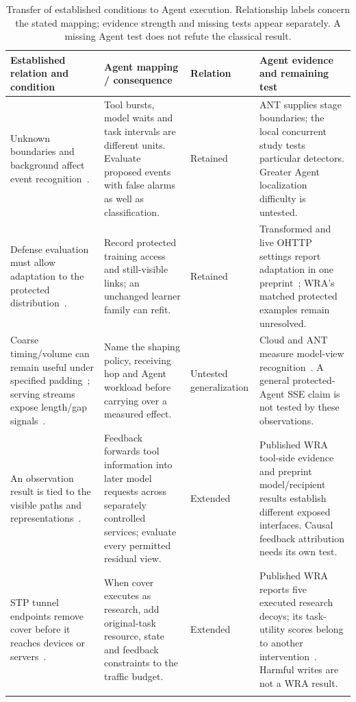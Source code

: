 \begin{table}[t]\centering\small
\caption{Transfer of established conditions to Agent execution. Relationship labels concern the stated mapping; evidence strength and missing tests appear separately. A missing Agent test does not refute the classical result.}\label{tab:transfer-matrix}
\setlength{\tabcolsep}{4pt}
\begin{tabularx}{\textwidth}{@{}P{.25\textwidth}P{.29\textwidth}P{.10\textwidth}Y@{}}\toprule
Established relation and condition & Agent mapping / consequence & Relation & Agent evidence and remaining test \\\midrule
Unknown boundaries and background affect event recognition~\cite{wang2016realistic,guan2021bapm,deng2023ares,trimananda2020pingpong}. & Tool bursts, model waits and task intervals are different units. Evaluate proposed events with false alarms as well as classification. & Retained & ANT supplies stage boundaries; the local concurrent study tests particular detectors. Greater Agent localization difficulty is untested. \\\addlinespace[3pt]
Defense evaluation must allow adaptation to the protected distribution~\cite{dyer2012peekaboo,mathews2023critical,tramer2020adaptive}. & Record protected training access and still-visible links; an unchanged learner family can refit. & Retained & Transformed and live OHTTP settings report adaptation in one preprint~\cite{dangol2026workflow}; WRA's matched protected examples remain unresolved. \\\addlinespace[3pt]
Coarse timing/volume can remain useful under specified padding~\cite{dyer2012peekaboo}; serving streams expose length/gap signals~\cite{weiss2024prompt,whisperleak2025}. & Name the shaping policy, receiving hop and Agent workload before carrying over a measured effect. & Untested generalization & Cloud and ANT measure model-view recognition~\cite{pouryousef2026traffic,li2026ant}. A general protected-Agent SSE claim is not tested by these observations. \\\addlinespace[3pt]
An observation result is tied to the visible paths and representations~\cite{chen2010web,apthorpe2019stp}. & Feedback forwards tool information into later model requests across separately controlled services; evaluate every permitted residual view. & Extended & Published WRA tool-side evidence and preprint model/recipient results establish different exposed interfaces. Causal feedback attribution needs its own test. \\\addlinespace[3pt]
STP tunnel endpoints remove cover before it reaches devices or servers~\cite[Sec.~7.1]{apthorpe2019stp}. & When cover executes as research, add original-task resource, state and feedback constraints to the traffic budget. & Extended & Published WRA reports five executed research decoys; its task-utility scores belong to another intervention~\cite{jeong2026wra}. Harmful writes are not a WRA result. \\\addlinespace[3pt]

\end{tabularx}
\end{table}
